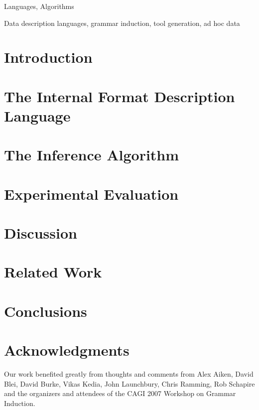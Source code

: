 \documentclass[natbib]{sigplanconf}
\begin{document}

\terms
Languages, Algorithms

\keywords
Data description languages, grammar induction, tool generation, ad hoc data


\section {Introduction}
\label{sec:intro}


\section{The Internal Format Description Language}
\label{sec:review}


\section{The Inference Algorithm}
\label{sec:inference}


\section{Experimental Evaluation}
\label{sec:exp}


\section{Discussion}
\label{sec:discussion}


\section{Related Work}
\label{sec:related}



\section{Conclusions}
\label{sec:conclusion}


\section*{Acknowledgments}

Our work benefited greatly from thoughts and comments from
Alex Aiken, David Blei, David Burke, Vikas Kedia, John Launchbury, Chris Ramming, 
Rob Schapire
and the organizers and attendees of the CAGI 2007 Workshop on Grammar
Induction.
\end{document}
